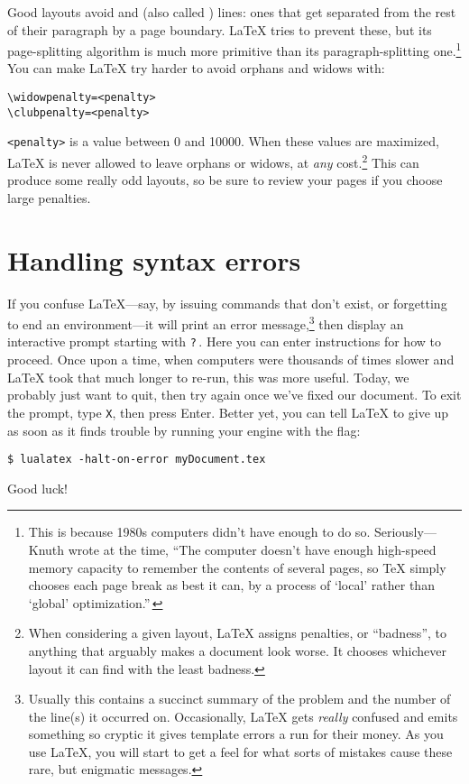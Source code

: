 Good layouts avoid  and 
(also called ) lines:
ones that get separated from the rest of their paragraph by a page boundary.
\LaTeX{} tries to prevent these, but its page-splitting algorithm
is much more primitive than its paragraph-splitting one.\punckern\footnote{%
This is because 1980s computers didn't have enough  to do so.
Seriously---Knuth wrote at the time,
``The computer doesn't have enough high-speed memory capacity to remember the
contents of several pages,
so \TeX{} simply chooses each page break as best it can, by a process of
`local' rather than `global' optimization.\quotekern''\,}
You can make \LaTeX{} try harder to avoid orphans and widows with:
\begin{leftfigure}
\begin{lstlisting}
\widowpenalty=<penalty>
\clubpenalty=<penalty>
\end{lstlisting}
\end{leftfigure}
\verb|<penalty>| is a value between 0 and 10000.
When these values are maximized,
\LaTeX{} is never allowed to leave orphans or widows,
at \emph{any} cost.\punckern\footnote{When considering a given layout,
\LaTeX{} assigns penalties, or ``badness''\quotekern,
to anything that arguably makes a document look worse.
It chooses whichever layout it can find with the least badness.}
This can produce some really odd layouts,
so be sure to review your pages if you choose large penalties.

\section{Handling syntax errors}
If you confuse \LaTeX{}---say, by issuing commands that don't exist,
or forgetting to end an environment---it will print an
error message,\punckern\footnote{Usually this contains a succinct summary of
the problem and the number of the line(s) it occurred on. Occasionally,
\LaTeX{} gets \emph{really} confused and emits something so cryptic it gives
\cpp{} template errors a run for their money.
As you use \LaTeX, you will start to get a feel for what sorts of
mistakes cause these rare, but enigmatic messages.}
then display an interactive prompt starting with \texttt{?}\,.
Here you can enter instructions for how to proceed.
Once upon a time, when computers were thousands of times slower and
\LaTeX{} took that much longer to re-run, this was more useful.
Today, we probably just want to quit,
then try again once we've fixed our document.
To exit the prompt, type \texttt{X}, then press Enter.
Better yet, you can tell \LaTeX{} to give up as soon as it finds trouble
by running your engine with the  flag:
\begin{leftfigure}
\begin{lstlisting}
$ lualatex -halt-on-error myDocument.tex
\end{lstlisting}
\end{leftfigure}
\vfill

\noindent Good luck!
